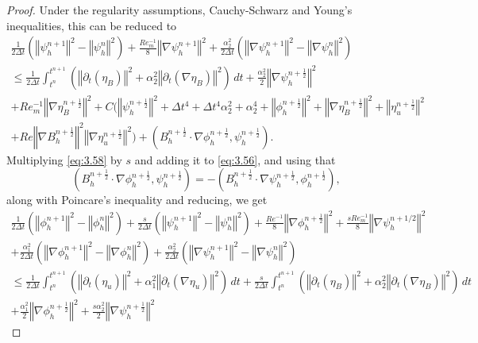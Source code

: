 \documentclass[11pt]{article}%
\numberwithin{equation}{section}
\newcommand{\norm}[1]{\left\Vert#1\right\Vert}
\def\grad{{\nabla}}
\def\nplushalf{{n+\frac12}}
\begin{document}
\begin{proof}
	 Under the regularity assumptions, Cauchy-Schwarz and Young's inequalities, this can be reduced to
	\begin{multline}
	\frac{1}{2\Delta t}(\norm{\psi^{n+1}_{h}}^{2} - \norm{\psi^{n}_{h}}^{2}) + \frac{Re^{-1}_{m}}{8}\norm{\grad{\psi^{n+1}_{h}}}^{2}+\frac{\alpha_2^2}{2\Delta t}(\norm{\grad{\psi}^{n+1}_{h}}^{2} - \norm{\grad{\psi}^{n}_{h}}^{2})\\
	 \leq \frac{1}{2\Delta t} \int^{t^{n+1}}_{t^{n}} (\norm{\partial_{t}(\eta_{B})}^{2}+\alpha_2^2\norm{\partial_{t}(\grad{\eta}_{B})}^{2})\, dt
	 + \frac{\alpha_2^2}{2}\norm{\grad{\psi_h^{\nplushalf}}}^2 \\+ Re^{-1}_{m}\norm{\grad{\eta^{\nplushalf}_{B}}}^{2}
	 + C( \norm{\psi_h^{\nplushalf}}^2 + \Delta t^4 +\Delta t^4 \alpha_2^2+ \alpha_2^4+ \norm{\phi_h^{\nplushalf}}^2
	 + \norm{\nabla \eta_B^{\nplushalf}}^2
	 + \norm{\eta_u^{\nplushalf}}^2 \\
	 + Re \norm{\nabla B_h^{\nplushalf}}^2\norm{\nabla \eta_u^{\nplushalf}}^2)
	 + (B^{\nplushalf}_{h} \cdot \grad{\phi^{\nplushalf}_{h}}, \psi^{\nplushalf}_{h}).
	 \label{eq:3.58}
	 \end{multline}
	 Multiplying \eqref{eq:3.58} by $s$ and adding it to \eqref{eq:3.56}, and using that
         \[
         (B^{\nplushalf}_{h} \cdot \grad{\phi^{\nplushalf}_{h}}, \psi^{\nplushalf}_{h})
         =
         -(B^{\nplushalf}_{h} \cdot \grad{\psi^{\nplushalf}_{h}}, \phi^{\nplushalf}_{h}),
         \]
         along with Poincare's inequality and reducing, we get
         	\begin{multline}
	\frac{1}{2\Delta t}(\norm{\phi^{n+1}_{h}}^{2} - \norm{\phi^{n}_{h}}^{2})
	 + \frac{s}{2\Delta t}(\norm{\psi^{n+1}_{h}}^{2} - \norm{\psi^{n}_{h}}^{2})
          + \frac{Re^{-1}}{8}\norm{\nabla \phi^{\nplushalf}_{h}}^{2}
	 + \frac{sRe^{-1}_{m}}{8}\norm{\grad{\psi^{n+1/2}_{h}}}^{2} \\+\frac{\alpha_1^2}{2\Delta t}(\norm{\grad{\phi}^{n+1}_{h}}^{2} - \norm{\grad{\phi}^{n}_{h}}^{2})+\frac{\alpha_2^2}{2\Delta t}(\norm{\grad{\psi}^{n+1}_{h}}^{2} - \norm{\grad{\psi}^{n}_{h}}^{2})\\
	\leq
	\frac{1}{2\Delta t}\int^{t^{n+1}}_{t^{n}} \left(\norm{\partial_{t}(\eta_{u})}^{2}+\alpha_1^2\norm{\partial_{t}(\grad{\eta}_{u})}^{2}\right)\, dt
	+ \frac{s}{2\Delta t} \int^{t^{n+1}}_{t^{n}}\left( \norm{\partial_{t}(\eta_{B})}^{2}+\alpha_2^2\norm{\partial_{t}(\grad{\eta}_{B})}^{2}\right)\, dt\\
	+ \frac{\alpha_1^2}{2}\norm{\grad{\phi_h^{\nplushalf}}}^2
	+\frac{s\alpha_2^2}{2}\norm{\grad{\psi_h^{\nplushalf}}}^2

\end{multline}
\end{proof}
\end{document}
